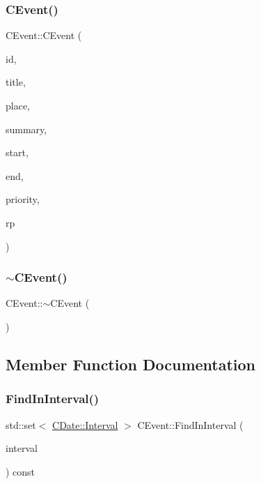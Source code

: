 \subsubsection{\texorpdfstring{C\+Event()}{CEvent()}}
{\footnotesize\ttfamily C\+Event\+::\+C\+Event (\begin{DoxyParamCaption}\item[{int}]{id,  }\item[{const std\+::string \&}]{title,  }\item[{const std\+::string \&}]{place,  }\item[{const std\+::string \&}]{summary,  }\item[{const \mbox{\hyperlink{class_c_date}{C\+Date}} \&}]{start,  }\item[{const \mbox{\hyperlink{class_c_date}{C\+Date}} \&}]{end,  }\item[{int}]{priority,  }\item[{\mbox{\hyperlink{class_c_event_repeat_base}{C\+Event\+Repeat\+Base}} $\ast$}]{rp }\end{DoxyParamCaption})}

\mbox{\label{class_c_event_ad088f3ce4e9585ce8fadafb5655511fb}} 
\subsubsection{\texorpdfstring{$\sim$\+C\+Event()}{~CEvent()}}
{\footnotesize\ttfamily C\+Event\+::$\sim$\+C\+Event (\begin{DoxyParamCaption}{ }\end{DoxyParamCaption})}



\subsection{Member Function Documentation}
\mbox{\label{class_c_event_af68e8c2b9541d6471bfe75b8c81d2f98}} 
\subsubsection{\texorpdfstring{Find\+In\+Interval()}{FindInInterval()}}
{\footnotesize\ttfamily std\+::set$<$ \mbox{\hyperlink{class_c_date_af23472c977b14ed341b48183ec19d874}{C\+Date\+::\+Interval}} $>$ C\+Event\+::\+Find\+In\+Interval (\begin{DoxyParamCaption}\item[{const \mbox{\hyperlink{class_c_date_af23472c977b14ed341b48183ec19d874}{C\+Date\+::\+Interval}} \&}]{interval }\end{DoxyParamCaption}) const}

